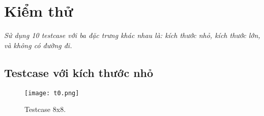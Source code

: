 \section{Kiểm thử}
\textit{Sử dụng 10 testcase với ba đặc trưng khác nhau là: kích thước nhỏ, kích thước lớn, và không có đường đi.}

\subsection{Testcase với kích thước nhỏ}

\begin{figure}[H]
\centering
\texttt{[image: t0.png]}
\caption{Testcase 8x8.}
\end{figure}



\newpage